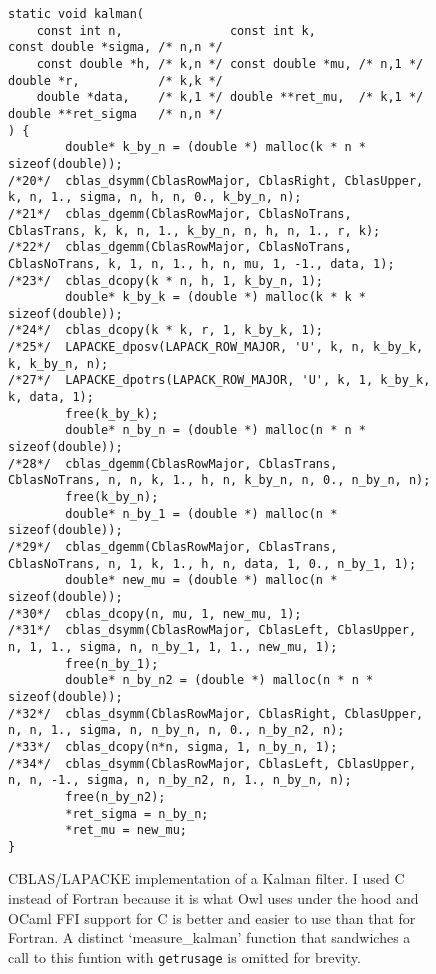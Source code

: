 \begin{sidewaysfigure}

    \begin{verbatim}
static void kalman(
    const int n,               const int k,                const double *sigma, /* n,n */
    const double *h, /* k,n */ const double *mu, /* n,1 */ double *r,           /* k,k */
    double *data,    /* k,1 */ double **ret_mu,  /* k,1 */ double **ret_sigma   /* n,n */
) {
        double* k_by_n = (double *) malloc(k * n * sizeof(double));
/*20*/  cblas_dsymm(CblasRowMajor, CblasRight, CblasUpper, k, n, 1., sigma, n, h, n, 0., k_by_n, n);
/*21*/  cblas_dgemm(CblasRowMajor, CblasNoTrans, CblasTrans, k, k, n, 1., k_by_n, n, h, n, 1., r, k);
/*22*/  cblas_dgemm(CblasRowMajor, CblasNoTrans, CblasNoTrans, k, 1, n, 1., h, n, mu, 1, -1., data, 1);
/*23*/  cblas_dcopy(k * n, h, 1, k_by_n, 1);
        double* k_by_k = (double *) malloc(k * k * sizeof(double));
/*24*/  cblas_dcopy(k * k, r, 1, k_by_k, 1);
/*25*/  LAPACKE_dposv(LAPACK_ROW_MAJOR, 'U', k, n, k_by_k, k, k_by_n, n);
/*27*/  LAPACKE_dpotrs(LAPACK_ROW_MAJOR, 'U', k, 1, k_by_k, k, data, 1);
        free(k_by_k);
        double* n_by_n = (double *) malloc(n * n * sizeof(double));
/*28*/  cblas_dgemm(CblasRowMajor, CblasTrans, CblasNoTrans, n, n, k, 1., h, n, k_by_n, n, 0., n_by_n, n);
        free(k_by_n);
        double* n_by_1 = (double *) malloc(n * sizeof(double));
/*29*/  cblas_dgemm(CblasRowMajor, CblasTrans, CblasNoTrans, n, 1, k, 1., h, n, data, 1, 0., n_by_1, 1);
        double* new_mu = (double *) malloc(n * sizeof(double));
/*30*/  cblas_dcopy(n, mu, 1, new_mu, 1);
/*31*/  cblas_dsymm(CblasRowMajor, CblasLeft, CblasUpper, n, 1, 1., sigma, n, n_by_1, 1, 1., new_mu, 1);
        free(n_by_1);
        double* n_by_n2 = (double *) malloc(n * n * sizeof(double));
/*32*/  cblas_dsymm(CblasRowMajor, CblasRight, CblasUpper, n, n, 1., sigma, n, n_by_n, n, 0., n_by_n2, n);
/*33*/  cblas_dcopy(n*n, sigma, 1, n_by_n, 1);
/*34*/  cblas_dsymm(CblasRowMajor, CblasLeft, CblasUpper, n, n, -1., sigma, n, n_by_n2, n, 1., n_by_n, n);
        free(n_by_n2);
        *ret_sigma = n_by_n;
        *ret_mu = new_mu;
}
    \end{verbatim}
    \caption{CBLAS/LAPACKE implementation of a Kalman filter. I used C instead
        of Fortran because it is what Owl uses under the hood and OCaml FFI
        support for C is better and easier to use than that for Fortran. A distinct
        `measure\_kalman' function that sandwiches a call to this funtion with
        \texttt{getrusage} is omitted for brevity.}\label{fig:cblas_kalman}

\end{sidewaysfigure}

